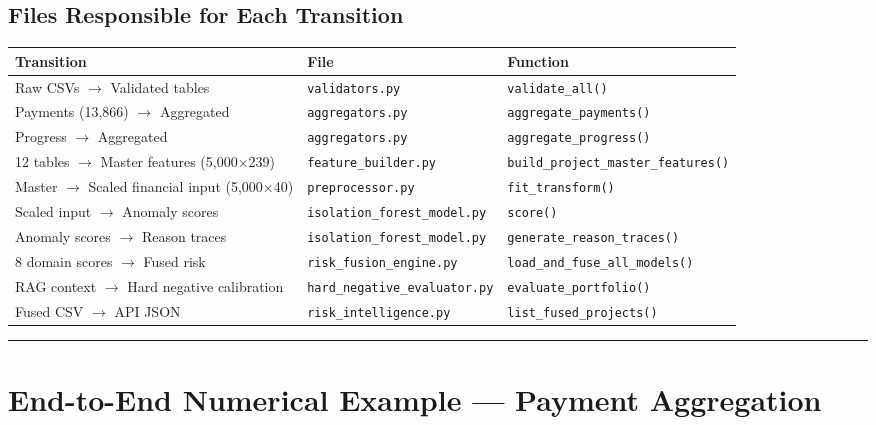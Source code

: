 \documentclass[11pt,a4paper]{article}
\begin{document}
\subsection{Files Responsible for Each Transition}

\begin{table}[htbp]
\centering
\small
\begin{tabularx}{\textwidth}{l l Y}
\toprule
\textbf{Transition} & \textbf{File} & \textbf{Function} \\
\midrule
Raw CSVs $\rightarrow$ Validated tables & \texttt{validators.py} & \texttt{validate\_all()} \\
Payments (13,866) $\rightarrow$ Aggregated & \texttt{aggregators.py} & \texttt{aggregate\_payments()} \\
Progress $\rightarrow$ Aggregated & \texttt{aggregators.py} & \texttt{aggregate\_progress()} \\
12 tables $\rightarrow$ Master features (5,000×239) & \texttt{feature\_builder.py} & \texttt{build\_project\_master\_features()} \\
Master $\rightarrow$ Scaled financial input (5,000×40) & \texttt{preprocessor.py} & \texttt{fit\_transform()} \\
Scaled input $\rightarrow$ Anomaly scores & \texttt{isolation\_forest\_model.py} & \texttt{score()} \\
Anomaly scores $\rightarrow$ Reason traces & \texttt{isolation\_forest\_model.py} & \texttt{generate\_reason\_traces()} \\
8 domain scores $\rightarrow$ Fused risk & \texttt{risk\_fusion\_engine.py} & \texttt{load\_and\_fuse\_all\_models()} \\
RAG context $\rightarrow$ Hard negative calibration & \texttt{hard\_negative\_evaluator.py} & \texttt{evaluate\_portfolio()} \\
Fused CSV $\rightarrow$ API JSON & \texttt{risk\_intelligence.py} & \texttt{list\_fused\_projects()} \\
\bottomrule
\end{tabularx}
\end{table}


\vspace{1em}\hrule\vspace{1em}

\section{End-to-End Numerical Example --- Payment Aggregation}
\end{document}
